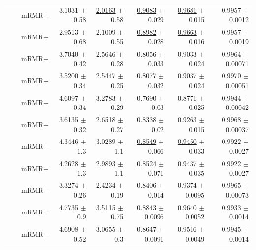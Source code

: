 \begin{longtable}{llp{}rrrrr}
 &  & mRMR+ & 3.1031 {\scriptsize $\pm$ 0.58} & \underline{2.0163} {\scriptsize $\pm$ 0.58} & \underline{0.9083} {\scriptsize $\pm$ 0.029} & \underline{0.9681} {\scriptsize $\pm$ 0.015} & 0.9957 {\scriptsize $\pm$ 0.0012} \\
 &  & mRMR+ & 2.9513 {\scriptsize $\pm$ 0.68} & 2.1009 {\scriptsize $\pm$ 0.55} & \underline{0.8982} {\scriptsize $\pm$ 0.028} & \underline{0.9663} {\scriptsize $\pm$ 0.016} & 0.9957 {\scriptsize $\pm$ 0.0019} \\
 &  & mRMR+ & 3.7040 {\scriptsize $\pm$ 0.42} & 2.5646 {\scriptsize $\pm$ 0.28} & 0.8056 {\scriptsize $\pm$ 0.033} & 0.9033 {\scriptsize $\pm$ 0.024} & 0.9964 {\scriptsize $\pm$ 0.00071} \\
 &  & mRMR+ & 3.5200 {\scriptsize $\pm$ 0.34} & 2.5447 {\scriptsize $\pm$ 0.25} & 0.8077 {\scriptsize $\pm$ 0.032} & 0.9037 {\scriptsize $\pm$ 0.024} & 0.9970 {\scriptsize $\pm$ 0.00051} \\
 &  & mRMR+ & 4.6097 {\scriptsize $\pm$ 0.34} & 3.2783 {\scriptsize $\pm$ 0.29} & 0.7690 {\scriptsize $\pm$ 0.03} & 0.8771 {\scriptsize $\pm$ 0.025} & 0.9944 {\scriptsize $\pm$ 0.00042} \\
 &  & mRMR+ & 3.6135 {\scriptsize $\pm$ 0.32} & 2.6518 {\scriptsize $\pm$ 0.27} & 0.8338 {\scriptsize $\pm$ 0.02} & 0.9263 {\scriptsize $\pm$ 0.015} & 0.9968 {\scriptsize $\pm$ 0.00037} \\
 &  & mRMR+ & 4.3446 {\scriptsize $\pm$ 1.3} & 3.0289 {\scriptsize $\pm$ 1.1} & \underline{0.8549} {\scriptsize $\pm$ 0.066} & \underline{0.9450} {\scriptsize $\pm$ 0.033} & 0.9922 {\scriptsize $\pm$ 0.0027} \\
 &  & mRMR+ & 4.2628 {\scriptsize $\pm$ 1.3} & 2.9893 {\scriptsize $\pm$ 1.1} & \underline{0.8524} {\scriptsize $\pm$ 0.071} & \underline{0.9437} {\scriptsize $\pm$ 0.035} & 0.9922 {\scriptsize $\pm$ 0.0027} \\
 &  & mRMR+ & 3.3274 {\scriptsize $\pm$ 0.26} & 2.4234 {\scriptsize $\pm$ 0.19} & 0.8406 {\scriptsize $\pm$ 0.014} & 0.9374 {\scriptsize $\pm$ 0.0095} & 0.9965 {\scriptsize $\pm$ 0.00073} \\
 &  & mRMR+ & 4.7735 {\scriptsize $\pm$ 0.9} & 3.5115 {\scriptsize $\pm$ 0.75} & 0.8843 {\scriptsize $\pm$ 0.0096} & 0.9640 {\scriptsize $\pm$ 0.0052} & 0.9933 {\scriptsize $\pm$ 0.0014} \\
 &  & mRMR+ & 4.6908 {\scriptsize $\pm$ 0.52} & 3.0655 {\scriptsize $\pm$ 0.3} & 0.8647 {\scriptsize $\pm$ 0.0091} & 0.9516 {\scriptsize $\pm$ 0.0049} & 0.9945 {\scriptsize $\pm$ 0.0014} \\

\end{longtable}
